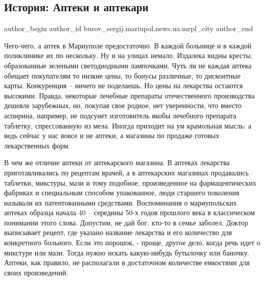  
 
 
 
 
 
\subsection{История: Аптеки и аптекари}
\label{sec:15_09_2017.stz.news.ua.mrpl_city.1.istoria_apteki_i_aptekari}
 
\ifcmt
 author_begin
   author_id burov_sergij.mariupol,news.ua.mrpl_city
 author_end
\fi


Чего-чего, а аптек в Мариуполе предостаточно. В каждой больнице и в каждой
поликлинике их по нескольку. Ну и на улицах немало. Издалека видны кресты,
образованные зелеными светодиодными лампочками. Чуть ли не каждая аптека
обещает покупателям то низкие цены, то бонусы различные, то дисконтные карты.
Конкуренция – ничего не поделаешь. Но цены на лекарства остаются высокими.
Правда, некоторые лечебные препараты отечественного производства дешевле
зарубежных, но, покупая свое родное, нет уверенности, что вместо аспирина,
например, не подсунет изготовитель якобы лечебного препарата таблетку,
спрессованную из мела. Иногда приходит на ум крамольная мысль: а ведь сейчас у
нас вовсе и не аптеки, а магазины по продаже готовых лекарственных форм.

В чем же отличие аптеки от аптекарского магазина. В аптеках лекарства
приготавливались по рецептам врачей, а в аптекарских магазинах продавались
таблетки, микстуры, мази и тому подобное, произведенное на фармацевтических
фабриках и специальным способом упакованное, люди старшего поколения называли
их патентованными средствами. Воспоминания о мариупольских аптеках образца
начала 40 – середины 50-х годов прошлого века в классическом понимании этого
слова. Допустим, не дай бог, кто-то в семье заболел. Доктор выписывает рецепт,
где указано название лекарства и его количество для конкретного больного. Если
это порошок, - проще, другое дело, когда речь идет о микстуре или мази. Тогда
нужно искать какую-нибудь бутылочку или баночку. Аптеки, как правило, не
располагали в достаточном количестве емкостями для своих произведений.

